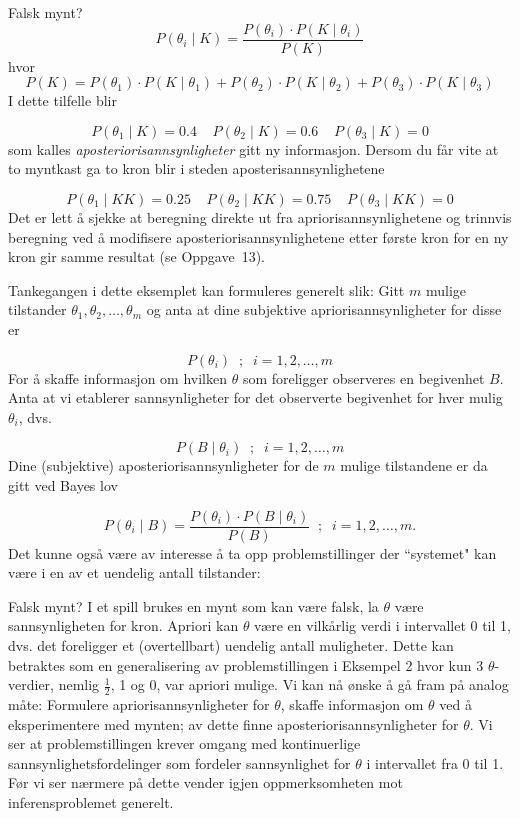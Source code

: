 {{\begin{eksempel}{Falsk mynt?}
\[ P({\theta}_i\mid K)=\frac{P({\theta}_i)\cdot P(K\mid {\theta}_i)}{P(K)} \]
hvor
\[ P(K)=P({\theta}_1)\cdot P(K\mid {\theta}_1)+
        P({\theta}_2)\cdot P(K\mid {\theta}_2)+
        P({\theta}_3)\cdot P(K\mid {\theta}_3)  \]
I dette tilfelle blir

\[ P({\theta}_1\mid K)=0.4 \;\;\;\; P({\theta}_2\mid K)=0.6 \;\;\;\;
                     P({\theta}_3\mid K)=0  \]
som kalles {\em aposteriorisannsynligheter} gitt ny informasjon.  Dersom
du får vite at to myntkast ga to kron blir i steden 
aposterisannsynlighetene

\[ P({\theta}_1\mid KK)=0.25 \;\;\;\; P({\theta}_2\mid KK)=0.75 \;\;\;\;
                     P({\theta}_3\mid KK)=0  \]
Det er lett å sjekke at beregning direkte ut fra 
apriorisannsynlighetene og trinnvis beregning ved å modifisere
aposteriorisannsynlighetene etter første kron for en ny kron gir 
samme resultat (se Oppgave~13).
\end{eksempel}

Tankegangen i dette eksemplet kan formuleres generelt slik:  Gitt
$m$ mulige tilstander ${\theta}_1, {\theta}_2, \ldots, {\theta}_m$ og
anta at dine subjektive apriorisannsynligheter for disse er

\[        P({\theta}_i) \;\; ; \;\;    i = 1,2,\ldots, m    \]
For å skaffe informasjon om hvilken $\theta$ som foreligger 
observeres en begivenhet $B$.  Anta at vi etablerer sannsynligheter for det
observerte begivenhet for hver mulig ${\theta}_i$, dvs.

\[        P(B\mid {\theta}_i) \;\; ; \;\;    i = 1,2,\ldots, m    \]
Dine (subjektive) aposteriorisannsynligheter for de $m$ mulige 
tilstandene er da gitt ved Bayes lov

\[ P({\theta}_i\mid B)=\frac{P({\theta}_i)\cdot P(B\mid {\theta}_i)}{P(B)}
    \;\; ; \; \; i=1,2,\ldots , m. \]
Det kunne også være av interesse å ta opp problemstillinger
der ``systemet" kan være i en av et uendelig antall tilstander:\\

\begin{eksempel}{Falsk mynt?}
I et spill brukes en mynt som kan være falsk, la $\theta$ være
sannsynligheten for kron.  Apriori kan $\theta$ være en vilkårlig
verdi i intervallet 0 til 1, dvs. det foreligger et (overtellbart)
uendelig antall muligheter.  Dette kan betraktes som en generalisering
av problemstillingen i Eksempel 2 hvor kun 3 $\theta$-verdier, nemlig
$\frac{1}{2}$, 1 og 0, var apriori mulige. Vi kan nå ønske å gå 
fram på analog måte:  Formulere apriorisannsynligheter for
$\theta$, skaffe informasjon om $\theta$ ved å eksperimentere med
mynten; av dette finne aposteriorisannsynligheter for $\theta$.  Vi ser
at problemstillingen krever omgang med kontinuerlige 
sannsynlighetsfordelinger som fordeler sannsynlighet for $\theta$ i 
intervallet fra 0 til 1. Før vi ser nærmere på dette vender
igjen oppmerksomheten mot inferensproblemet generelt.\\
\end{eksempel}

}}
